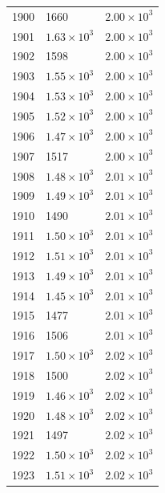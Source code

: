 \begin{table}[H]
\begin{tabular}{lll}
1900 & 1660 & $\displaystyle 2.00 \times 10^{3}$ \\
1901 & $\displaystyle 1.63 \times 10^{3}$ & $\displaystyle 2.00 \times 10^{3}$ \\
1902 & 1598 & $\displaystyle 2.00 \times 10^{3}$ \\
1903 & $\displaystyle 1.55 \times 10^{3}$ & $\displaystyle 2.00 \times 10^{3}$ \\
1904 & $\displaystyle 1.53 \times 10^{3}$ & $\displaystyle 2.00 \times 10^{3}$ \\
1905 & $\displaystyle 1.52 \times 10^{3}$ & $\displaystyle 2.00 \times 10^{3}$ \\
1906 & $\displaystyle 1.47 \times 10^{3}$ & $\displaystyle 2.00 \times 10^{3}$ \\
1907 & 1517 & $\displaystyle 2.00 \times 10^{3}$ \\
1908 & $\displaystyle 1.48 \times 10^{3}$ & $\displaystyle 2.01 \times 10^{3}$ \\
1909 & $\displaystyle 1.49 \times 10^{3}$ & $\displaystyle 2.01 \times 10^{3}$ \\
1910 & 1490 & $\displaystyle 2.01 \times 10^{3}$ \\
1911 & $\displaystyle 1.50 \times 10^{3}$ & $\displaystyle 2.01 \times 10^{3}$ \\
1912 & $\displaystyle 1.51 \times 10^{3}$ & $\displaystyle 2.01 \times 10^{3}$ \\
1913 & $\displaystyle 1.49 \times 10^{3}$ & $\displaystyle 2.01 \times 10^{3}$ \\
1914 & $\displaystyle 1.45 \times 10^{3}$ & $\displaystyle 2.01 \times 10^{3}$ \\
1915 & 1477 & $\displaystyle 2.01 \times 10^{3}$ \\
1916 & 1506 & $\displaystyle 2.01 \times 10^{3}$ \\
1917 & $\displaystyle 1.50 \times 10^{3}$ & $\displaystyle 2.02 \times 10^{3}$ \\
1918 & 1500 & $\displaystyle 2.02 \times 10^{3}$ \\
1919 & $\displaystyle 1.46 \times 10^{3}$ & $\displaystyle 2.02 \times 10^{3}$ \\
1920 & $\displaystyle 1.48 \times 10^{3}$ & $\displaystyle 2.02 \times 10^{3}$ \\
1921 & 1497 & $\displaystyle 2.02 \times 10^{3}$ \\
1922 & $\displaystyle 1.50 \times 10^{3}$ & $\displaystyle 2.02 \times 10^{3}$ \\
1923 & $\displaystyle 1.51 \times 10^{3}$ & $\displaystyle 2.02 \times 10^{3}$ \\

\end{tabular}
\end{table}
